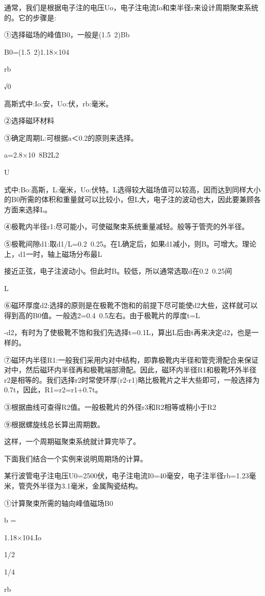 通常，我们是根据电子注的电压Uo，电子注电流Io和束半径r来设计周期聚束系统的。它的步骤是:


①选择磁场的峰值B0，一般是(1.5~2)Bb


B0=(1.5~2)1.18×104


rb


√0


高斯式中:Io:安，Uo:伏，rb:毫米。


②选择磁环材料


③确定周期L:可根据a＜0.2的原则来选择。


a=2.8×10~8B2L2


U


式中:Bo:高斯，L:毫米，Uo:伏特。L选得较大磁场值可以较高，因而达到同样大小的B0所需的体积和重量就可以比较小，但L大，电子注的波动也大，因此要兼顾各方面来选择L。


④极靴内半径r1:尽可能小，可使磁聚束系统重量减轻。般等于管壳的外半径。


⑤极靴间隙d1:取d1/L=0.2~0.25。在L确定后，如果d1减小，则B。可增大。理论上，d1一时，轴上磁场分布最L


接近正弦，电子注波动小。但此时B。较低，所以通常选取d在0.2~0.25间


L


⑥磁环厚度d2:选择的原则是在极靴不饱和的前提下尽可能使d2大些，这样就可以得到高的B0值。一般选2=0.4~0.5左右。由于极靴片的厚度t=L


-d2，有时为了使极靴不饱和我们先选择t=0.1L，算出L后由t再来决定d2，也是一样的。


⑦磁环内半径R1:一般我们采用内对中结构，即靠极靴内半径和管壳滑配合来保证对中，然后磁环内半径再和极靴端部滑配。因此，磁环内半径R1和极靴环外半径r2是相等的。我们选择r2时常使环厚(r2-r1)略比极靴片之半大些即可，一般选择为0.7t，因此，R1=r2=r1+0.7t。


③根据曲线可查得R2值。一般极靴片的外径r3和R2相等或稍小于R2


⑨根据螺旋线总长算出周期数。


这样，一个周期磁聚束系统就计算完毕了。


下面我们结合一个实例来说明周期场的计算。


某行波管电子注电压U0=2500伏，电子注电流I0=40毫安，电子注半径rb=1.23毫米，管壳外半径为3.1毫米，金属陶瓷结构。


①计算聚束所需的轴向峰值磁场B0


b =


1.18×104.Io


1/2


1/4


rb



